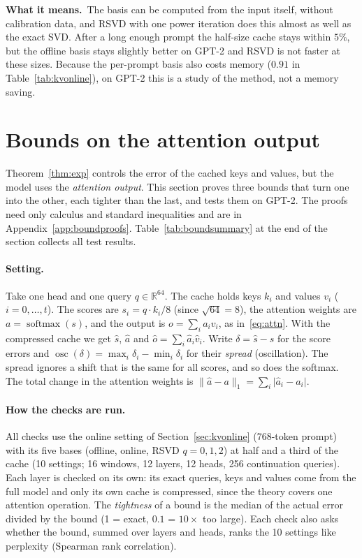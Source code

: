 \documentclass[10pt]{article}
\theoremstyle{plain}
\theoremstyle{definition}
\theoremstyle{remark}
\newcommand{\R}{\mathbb{R}}
\DeclareMathOperator{\osc}{osc}
\newcommand{\softmax}{\operatorname{softmax}}
\newcommand{\means}{\noindent\textbf{What it means.}\ }
\begin{document}
\means The basis can be computed from the input itself, without calibration data, and RSVD with one power iteration does this almost as well as the exact SVD. After a long enough prompt the half-size cache stays within $5\%$, but the offline basis stays slightly better on GPT-2 and RSVD is not faster at these sizes. Because the per-prompt basis also costs memory ($0.91$ in Table~\ref{tab:kvonline}), on GPT-2 this is a study of the method, not a memory saving.

\section{Bounds on the attention output}
\label{sec:kvbound}

Theorem~\ref{thm:exp} controls the error of the cached keys and values, but the model uses the \emph{attention output}. This section proves three bounds that turn one into the other, each tighter than the last, and tests them on GPT-2. The proofs need only calculus and standard inequalities and are in Appendix~\ref{app:boundproofs}. Table~\ref{tab:boundsummary} at the end of the section collects all test results.

\paragraph{Setting.}
Take one head and one query $q\in\R^{64}$. The cache holds keys $k_i$ and values $v_i$ ($i=0,\dots,t$). The scores are $s_i=q\cdot k_i/8$ (since $\sqrt{64}=8$), the attention weights are $a=\softmax(s)$, and the output is $o=\sum_ia_iv_i$, as in~\eqref{eq:attn}. With the compressed cache we get $\hat s$, $\hat a$ and $\hat o=\sum_i\hat a_i\hat v_i$. Write $\delta=\hat s-s$ for the score errors and $\osc(\delta)=\max_i\delta_i-\min_i\delta_i$ for their \emph{spread} (oscillation). The spread ignores a shift that is the same for all scores, and so does the softmax. The total change in the attention weights is $\lVert\hat a-a\rVert_1=\sum_i\lvert\hat a_i-a_i\rvert$.

\paragraph{How the checks are run.}
All checks use the online setting of Section~\ref{sec:kvonline} (768-token prompt) with its five bases (offline, online, RSVD $q=0,1,2$) at half and a third of the cache (10 settings; 16 windows, 12 layers, 12 heads, 256 continuation queries). Each layer is checked on its own: its exact queries, keys and values come from the full model and only its own cache is compressed, since the theory covers one attention operation. The \emph{tightness} of a bound is the median of the actual error divided by the bound (1 = exact, $0.1$ = $10\times$ too large). Each check also asks whether the bound, summed over layers and heads, ranks the 10 settings like perplexity (Spearman rank correlation).
\end{document}
